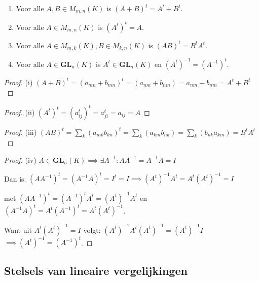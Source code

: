 \begin{lemma}[1.3.13]

    \begin{enumerate}
        \item[(i)] Voor alle $A, B \in M_{m,n}(K)$ is $(A + B)^t = A^t + B^t$.
        \item[(ii)] Voor alle $A \in M_{m,n}(K)$ is $(A^t)^t = A$.
        \item[(iii)] Voor alle $A \in M_{m,k}(K), B \in M_{k,n}(K)$ is $(AB)^t = B^t A^t$.
        \item[(iv)] Voor alle $A \in \mathbf{GL}_n(K)$ is $A^t \in \mathbf{GL}_n(K)$ en $(A^t)^{-1} = (A^{-1})^t$.
    \end{enumerate}
\end{lemma}
\begin{proof}(i)
    \(
        (A+B)^t
        = (a_{mn} + b_{mn})^t
        = (a_{nm} + b_{nm})
        = a_{nm} + b_{nm}
        = A^t + B^t
    \)
\end{proof}
\begin{proof}(ii)
    \(
        (A^t)^t = (a_{ij}^t)^t = a_{ji}^t = a_{ij} = A
    \)
\end{proof}
\begin{proof}(iii)
    \(
        (AB)^t
        = \sum_{k} (a_{mk}b_{kn})^t
        = \sum_{k} (a_{km}b_{nk})
        = \sum_{k} (b_{nk}a_{km})
        = B^tA^t
    \)
\end{proof}
\begin{proof}(iv)
    \(A \in \mathbf{GL}_n(K) \implies \exists A^{-1}: AA^{-1} = A^{-1}A = I\)

    Dan is: \((AA^{-1})^t = (A^{-1}A)^t = I^t = I \implies (A^{t})^{-1} A^t = A^t(A^{t})^{-1} = I\)

    met \((AA^{-1})^t  = (A^{-1})^t A^t = (A^{t})^{-1} A^t\) en \((A^{-1}A)^t = A^t(A^{-1})^t = A^t(A^{t})^{-1}\).

    Want uit \(A^t(A^{t})^{-1} = I\) volgt: \((A^t)^{-1}A^t(A^{t})^{-1} = (A^t)^{-1}I\)
    \(\implies (A^t)^{-1} = (A^{-1})^t\).
\end{proof}


\subsection{Stelsels van lineaire vergelijkingen}

